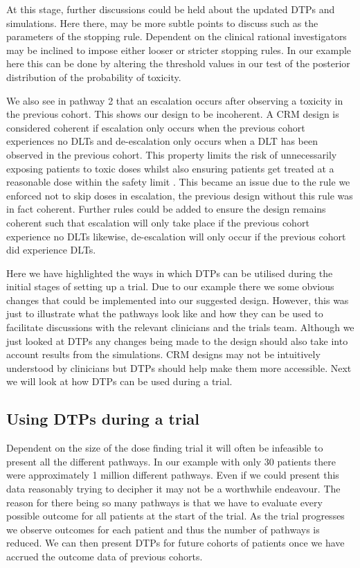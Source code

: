 At this stage, further discussions could be held about the updated DTPs and simulations. Here there, may be more subtle points to discuss such as the parameters of the stopping rule. Dependent on the clinical rational investigators may be inclined to impose either looser or stricter stopping rules. In our example here this can be done by altering the threshold values in our test of the posterior distribution of the probability of toxicity. 

We also see in pathway 2 that an escalation occurs after observing a toxicity in the previous cohort. This shows our design to be incoherent. A CRM design is considered coherent if escalation only occurs when the previous cohort experiences no DLTs and de-escalation only occurs when a DLT has been observed in the previous cohort. This property limits the risk of unnecessarily exposing patients to toxic doses whilst also ensuring patients get treated at a reasonable dose within the safety limit \cite{cheungDoseFindingContinual2011}. This became an issue due to the rule we enforced not to skip doses in escalation, the previous design without this rule was in fact coherent. Further rules could be added to ensure the design remains coherent such that escalation will only take place if the previous cohort experience no DLTs likewise, de-escalation will only occur if the previous cohort did experience DLTs. 

Here we have highlighted the ways in which DTPs can be utilised during the initial stages of setting up a trial. Due to our example there we some obvious changes that could be implemented into our suggested design. However, this was just to illustrate what the pathways look like and how they can be used to facilitate discussions with the relevant clinicians and the trials team. Although we just looked at DTPs any changes being made to the design should also take into account results from the simulations. CRM designs may not be intuitively understood by clinicians but DTPs should help make them more accessible. Next we will look at how DTPs can be used during a trial.  

\subsection{Using DTPs during a trial}

Dependent on the size of the dose finding trial it will often be infeasible to present all the different pathways. In our example with only 30 patients there were approximately 1 million different pathways. Even if we could present this data reasonably trying to decipher it may not be a worthwhile endeavour. The reason for there being so many pathways is that we have to evaluate every possible outcome for all patients at the start of the trial. As the trial progresses we observe outcomes for each patient and thus the number of pathways is reduced. We can then present DTPs for future cohorts of patients once we have accrued the outcome data of previous cohorts. 


